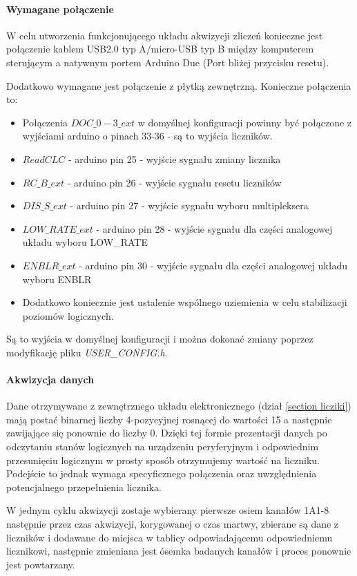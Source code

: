 \paragraph{Wymagane połączenie}
W celu utworzenia funkcjonującego układu akwizycji zliczeń konieczne jest połączenie kablem USB2.0 typ A/micro-USB typ B między komputerem sterującym a natywnym portem Arduino Due (Port bliżej przycisku resetu).

Dodatkowo wymagane jest połączenie z płytką zewnętrzną. Konieczne połączenia to:
\begin{itemize}
        \item Połączenia $DOC\_0-3\_ext$ w domyślnej konfiguracji powinny być połączone z wyjściami arduino o pinach 33-36 - są to wyjścia liczników.
        \item $ReadCLC$ - arduino pin 25 - wyjście sygnału zmiany licznika
        \item $RC\_B\_ext$ - arduino pin 26 - wyjście sygnału resetu liczników 
        \item $DIS\_S\_ext$ - arduino pin 27 - wyjście sygnału wyboru multipleksera
        \item $LOW\_RATE\_ext$ - arduino pin 28 - wyjście sygnału dla części analogowej układu wyboru LOW\_RATE
        \item $ENBLR\_ext$ - arduino pin 30 - wyjście sygnału dla części analogowej układu wyboru ENBLR 
        \item Dodatkowo koniecznie jest ustalenie wspólnego uziemienia w celu stabilizacji poziomów logicznych.
\end{itemize}

Są to wyjścia w domyślnej konfiguracji i można dokonać zmiany poprzez modyfikację pliku \textit{USER\_CONFIG.h}.



\paragraph{Akwizycja danych}
Dane otrzymywane z zewnętrznego układu elektronicznego (dział \ref{section licziki}) mają postać binarnej liczby 4-pozycyjnej rosnącej do wartości 15 a następnie zawijające się ponownie do liczby 0. 
Dzięki tej formie prezentacji danych po odczytaniu stanów logicznych na urządzeniu peryferyjnym i odpowiednim przesunięciu logicznym w prosty sposób otrzymujemy wartość na liczniku. 
Podejście to jednak wymaga specyficznego połączenia oraz uwzględnienia potencjalnego przepełnienia licznika. 

W jednym cyklu akwizycji zostaje wybierany pierwsze osiem kanałów 1A1-8 następnie przez czas akwizycji, korygowanej o czas martwy, zbierane są dane z liczników i dodawane do miejsca w tablicy odpowiadającemu odpowiedniemu licznikowi, następnie zmieniana jest ósemka badanych kanałów i proces ponownie jest powtarzany. 

